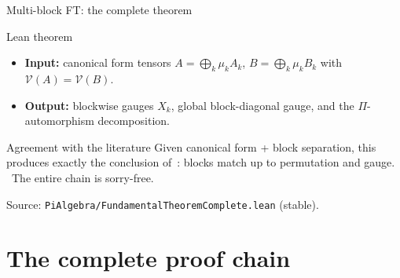 \documentclass[aspectratio=169,10pt]{beamer}
\begin{document}
\begin{frame}{Multi-block FT: the complete theorem}
    \vspace{-0.6em}

    \begin{block}{Lean theorem}
        \begin{itemize}\itemsep0.15em
            \item \textbf{Input:} canonical form tensors $A = \bigoplus_k \mu_k A_k$,
                  $B = \bigoplus_k \mu_k B_k$ with $\mathcal{V}(A) = \mathcal{V}(B)$.
            \item \textbf{Output:} blockwise gauges $X_k$, global block-diagonal gauge,
                  and the $\Pi$-automorphism decomposition.
        \end{itemize}
    \end{block}

    \begin{block}{Agreement with the literature}
        Given canonical form + block separation, this produces exactly
        the conclusion of~\cite{Cirac2017Annals,Cirac2021Matrix}:
        \alert{blocks match up to permutation and gauge.}
        \textcolor{leangreen}{\checkmark\ The entire chain is sorry-free.}
    \end{block}

    \textcolor{dimwhite}{\footnotesize Source: \texttt{PiAlgebra/FundamentalTheoremComplete.lean} (stable).}
\end{frame}

\section{The complete proof chain}
\end{document}
